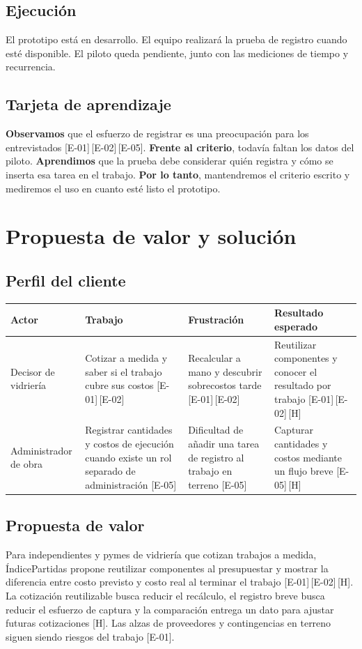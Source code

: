 \documentclass[11pt]{article}
\newcommand{\ev}[1]{\textcolor{prblue}{[#1]}}
\newcommand{\hip}{\textcolor{prorange}{[H]}}
\begin{document}
\subsection{Ejecución}
El prototipo está en desarrollo. El equipo realizará la prueba de
registro cuando esté disponible. El piloto queda pendiente, junto con
las mediciones de tiempo y recurrencia.

\subsection{Tarjeta de aprendizaje}
\textbf{Observamos} que el esfuerzo de registrar es una preocupación
para los entrevistados \ev{E-01}\,\ev{E-02}\,\ev{E-05}.
\textbf{Frente al criterio}, todavía faltan los datos del piloto.
\textbf{Aprendimos} que la prueba debe considerar quién registra y
cómo se inserta esa tarea en el trabajo. \textbf{Por lo tanto},
mantendremos el criterio escrito y mediremos el uso en cuanto esté
listo el prototipo.

\section{Propuesta de valor y solución}

\subsection{Perfil del cliente}
\begin{tabularx}{\linewidth}{@{}lXXX@{}}
\toprule
\textbf{Actor} & \textbf{Trabajo} & \textbf{Frustración} & \textbf{Resultado esperado} \\
\midrule
Decisor de vidriería &
Cotizar a medida y saber si el trabajo cubre sus costos \ev{E-01}\,\ev{E-02} &
Recalcular a mano y descubrir sobrecostos tarde \ev{E-01}\,\ev{E-02} &
Reutilizar componentes y conocer el resultado por trabajo \ev{E-01}\,\ev{E-02}\,\hip \\
\addlinespace
Administrador de obra &
Registrar cantidades y costos de ejecución cuando existe un rol
separado de administración \ev{E-05} &
Dificultad de añadir una tarea de registro al trabajo en terreno \ev{E-05} &
Capturar cantidades y costos mediante un flujo breve \ev{E-05}\,\hip \\
\bottomrule
\end{tabularx}

\subsection{Propuesta de valor}
Para independientes y pymes de vidriería que cotizan trabajos a medida,
ÍndicePartidas propone reutilizar componentes al presupuestar y mostrar
la diferencia entre costo previsto y costo real al terminar el trabajo
\ev{E-01}\,\ev{E-02}\,\hip. La cotización reutilizable busca reducir el
recálculo, el registro breve busca reducir el esfuerzo de captura y la
comparación entrega un dato para ajustar futuras cotizaciones \hip.
Las alzas de proveedores y contingencias en terreno siguen siendo
riesgos del trabajo \ev{E-01}.
\end{document}
